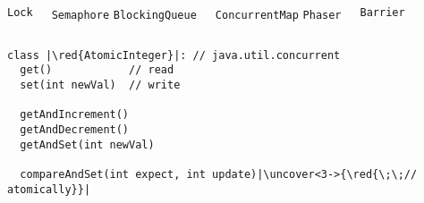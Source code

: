\begin{frame}{}
\end{frame}

\begin{frame}{}
    {\vspace{0.30cm}\centerline{\Large {}}}
\end{frame}

\begin{frame}{}
    {\vspace{0.30cm}\centerline{\Large {}}}
\end{frame}

\begin{frame}{}
  \begin{columns}
  \end{columns}

  \vspace{1.00cm}
  \centerline{\Large {}}
\end{frame}

\begin{frame}[fragile]{}
  \begin{columns}
      \texttt{\quad\qquad Lock}

      \texttt{\quad\qquad Semaphore}
      \texttt{\quad BlockingQueue}
      
      \texttt{\quad ConcurrentMap}
      \texttt{\qquad Phaser}

      \texttt{\qquad Barrier}
  \end{columns}

  \pause
  \vspace{0.50cm}
  \begin{lstlisting}[style = CStyle]
class |\red{AtomicInteger}|: // java.util.concurrent
  get()            // read
  set(int newVal)  // write

  getAndIncrement()
  getAndDecrement()
  getAndSet(int newVal)

  compareAndSet(int expect, int update)|\uncover<3->{\red{\;\;// atomically}}|
  \end{lstlisting}
\end{frame}

